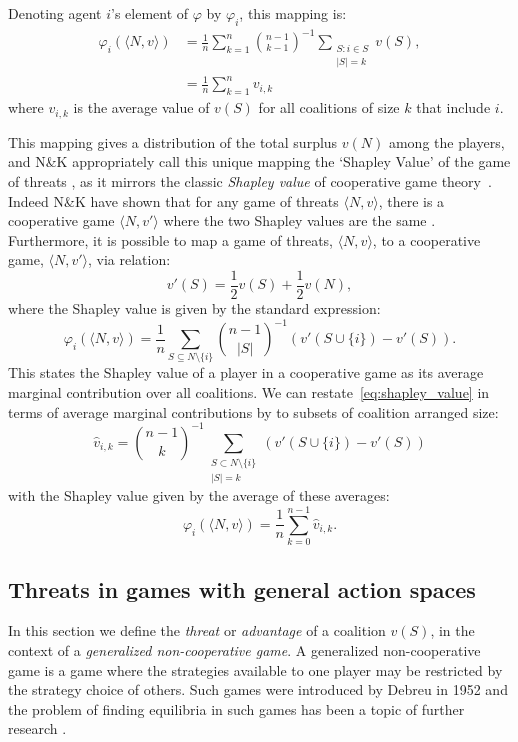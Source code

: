 Denoting agent $i$'s element of $\varphi$ by $\varphi_i$, 
this mapping is:
\begin{align}  
\varphi_i(\langle N,v\rangle)
& = \frac{1}{n}\sum_{k=1}^n {\binom{n-1}{k-1}}^{-1} \sum_{\substack{S:i\in S \\ |S|=k}} v(S),  \label{da_value_eq} \nonumber \\
& = \frac{1}{n}\sum_{k=1}^n v_{i,k}
\end{align}
where $v_{i,k}$ is the average value of $v(S)$ for all coalitions of size $k$ that include $i$.

This mapping gives a distribution of the total surplus $v(N)$ among the players, and N\&K appropriately call this unique mapping the `Shapley Value' of the game of threats \cite{KOHLBERG2018139}, 
as it mirrors the classic \textit{Shapley value} of cooperative game theory~\cite{Shapley1953a}.
Indeed N\&K have shown that for any game of threats $\langle N,v\rangle$, there is a cooperative game $\langle N,v'\rangle$ where the two Shapley values are the same \cite{KOHLBERG2018139}.
Furthermore, it is possible to map a game of threats, $\langle N,v\rangle$, to a cooperative game, $\langle N,v'\rangle$, via relation:
\begin{equation}\label{convert1}
v'(S)=\frac{1}{2}v(S)+\frac{1}{2}v(N),
\end{equation}
where the Shapley value is given by the standard expression:
\begin{equation}\label{eq:shapley_value}
    \varphi_i(\langle N,v\rangle)= \frac{1}{n}\sum_{S\subseteq N\setminus\{i\}} \binom{n-1}{|S|}^{-1} \left(v'(S\cup\{i\})-v'(S)\right). 
\end{equation}
This states the Shapley value of a player in a cooperative game as its average marginal contribution over all coalitions. 
We can restate~\eqref{eq:shapley_value} in terms of average marginal contributions by to subsets of coalition arranged size:
\begin{equation}\label{eq:shapley_value2}
 \hat{v}_{i,k} = {\binom{n-1}{k}}^{-1} \sum_{\substack{S\subset N\setminus \{ i\} \\ |S|=k}} %
 (v'(S\cup\{i\})-v'(S))
\end{equation}
with the Shapley value given by the average of these averages:
\begin{equation}\label{shap2} 
 \varphi_i(\langle N,v\rangle) = \frac{1}{n}\sum_{k=0}^{n-1}\hat{v}_{i,k}. 
\end{equation}

\subsection{Threats in games with general action spaces}\label{the_value_def3}
In this section we define the \emph{threat} or \emph{advantage} of a coalition $v(S)$, in the context of a \textit{generalized non-cooperative game}.
A generalized non-cooperative game is a game where the strategies available to one player may be restricted by the strategy choice of others.
Such games were introduced by Debreu in 1952 \cite{Debreu01101952} and the problem of finding equilibria in such games has been a topic of further research \cite{Facchinei2007,fischer2014,DutangSurvey}.

